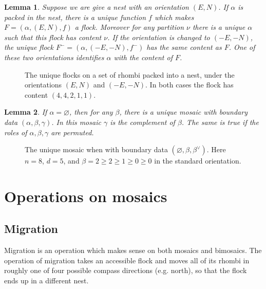 \documentclass[12pt]{article}
\newtheorem{lemma}{Lemma}[section]
\begin{document}
\begin{lemma}
\label{lem:uniqueflock}
Suppose we are give a nest with an orientation $(E,N)$.
If $\alpha$ is packed in the nest, there is a unique function $f$ 
which makes $F = (\alpha, (E,N), f)$ a flock. 
Moreover for any partition
$\nu$ there is a unique $\alpha$ such that this flock has content
$\nu$.  If the orientation is changed to $(-E,-N)$, the unique flock 
$F^- = (\alpha, (-E,-N), f^-)$ has the same content as $F$.  One
of these two orientations identifies $\alpha$ with the content of $F$.
\end{lemma}

%
\begin{figure}[htbp]
\begin{center}
\caption{The unique flocks on a set of rhombi packed into a nest,
under the orientations $(E,N)$ and $(-E,-N)$.  In both cases
the flock has content $(4,4,2,1,1)$.}
\label{fig:canonicalflock}
\end{center}
\end{figure}
%

\begin{lemma}
\label{lem:uniquemosaic}
If $\alpha = \varnothing$, then for any $\beta$, there is a unique
mosaic with boundary data $(\alpha, \beta, \gamma)$.  In this
mosaic $\gamma$ is the complement of $\beta$. 
The same is true if the roles of $\alpha, \beta, \gamma$ are
permuted.
\end{lemma}

%
\begin{figure}[htbp]
\begin{center}
\caption{The unique mosaic when with boundary data 
$(\varnothing, \beta, \beta^\vee)$. Here $n=8$, $d=5$, and 
$\beta = 2 \geq 2 \geq 1 \geq 0 \geq 0$ in the standard orientation.}
\label{fig:canonicalmosaic}
\end{center}
\end{figure}
%


\section{Operations on mosaics}
\label{sec:operations}
\subsection{Migration}
Migration is an operation which makes sense on both mosaics and 
bimosaics.  The operation of migration takes an accessible flock and
moves all of its rhombi in roughly one of four possible compass
directions (e.g. north), so that the flock ends up in a different nest.
\end{document}
